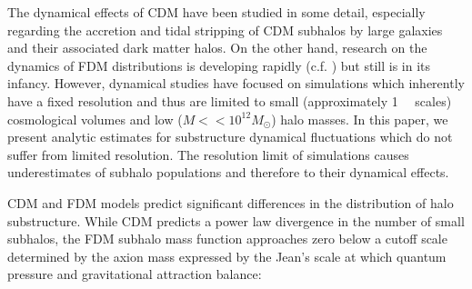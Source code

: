 \documentclass[usenatbib]{mnras}
\begin{document}
\par

The dynamical effects of CDM have been studied in some detail, especially regarding the accretion and tidal stripping of CDM subhalos by large galaxies and their associated dark matter halos. On the other hand, research on the dynamics of FDM distributions is developing rapidly (c.f. \cite{schive_solitons, Schrodinger-Poisson, Schive-virialized-wave-halos, relaxation}) but still is in its infancy. However, dynamical studies have focused on simulations which inherently have a fixed resolution and thus are limited to small (approximately \SI{1}{\mega \parsec} scales) cosmological volumes and low ($M << 10^{12} M_{\odot}$) halo masses. In this paper, we present analytic estimates for substructure dynamical fluctuations which do not suffer from limited resolution. The resolution limit of simulations causes underestimates of subhalo populations and therefore to their dynamical effects. 
\par 
	CDM and FDM models predict significant differences in the distribution of halo substructure. While CDM predicts a power law divergence in the number of small subhalos, the FDM subhalo mass function approaches zero below a cutoff scale determined by the axion mass expressed by the Jean’s scale at which quantum pressure and gravitational attraction balance:
\setlength{\belowdisplayskip}{4pt} \setlength{\belowdisplayshortskip}{4pt}
\setlength{\abovedisplayskip}{4pt} \setlength{\abovedisplayshortskip}{4pt}
\end{document}
